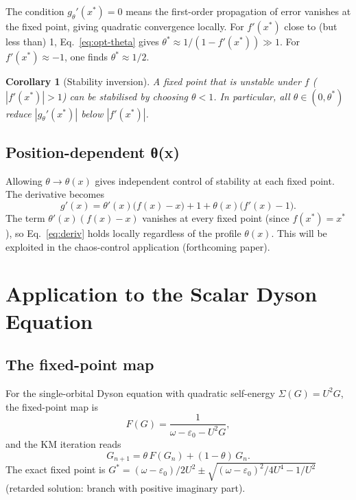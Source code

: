 \documentclass[aps,prb,twocolumn,superscriptaddress,nofootinbib,longbibliography,floatfix]{revtex4-2}
\newcommand{\param}{\theta}
\newcommand{\optparam}{\theta^{*}}
\newcommand{\Gstar}{G^{*}}
\theoremstyle{plain}
\newtheorem{corollary}[proposition]{Corollary}
\theoremstyle{remark}
\begin{document}
The condition $g_\param'(x^*) = 0$ means the first-order
propagation of error vanishes at the fixed point, giving
quadratic convergence locally.  For $f'(x^*)$ close to (but
less than) 1, Eq.~\eqref{eq:opt-theta} gives
$\optparam \approx 1/(1-f'(x^*)) \gg 1$.  For
$f'(x^*) \approx -1$, one finds $\optparam \approx 1/2$.

\begin{corollary}[Stability inversion]
\label{cor:inv}
A fixed point that is unstable under $f$ ($|f'(x^*)| > 1$) can
be stabilised by choosing $\param < 1$.  In particular, all
$\param \in (0, \optparam)$ reduce $|g_\param'(x^*)|$ below
$|f'(x^*)|$.
\end{corollary}

\subsection{Position-dependent θ(x)}
\label{ssec:local}

Allowing $\param \to \param(x)$ gives independent control of
stability at each fixed point.  The derivative becomes
%
\begin{equation}
  g'(x) = \param'(x)\bigl(f(x)-x\bigr)
           + 1 + \param(x)\bigl(f'(x)-1\bigr).
\end{equation}
%
The term $\param'(x)(f(x)-x)$ vanishes at every fixed point
(since $f(x^*) = x^*$), so Eq.~\eqref{eq:deriv} holds
locally regardless of the profile $\param(x)$.  This will be
exploited in the chaos-control application (forthcoming paper).

\section{Application to the Scalar Dyson Equation}
\label{sec:scalar}

\subsection{The fixed-point map}
\label{ssec:fp-map}

For the single-orbital Dyson equation with quadratic
self-energy $\Sigma(G) = U^2 G$, the fixed-point map is
%
\begin{equation}
  F(G) = \frac{1}{\omega - \varepsilon_0 - U^2 G},
  \label{eq:F}
\end{equation}
%
and the KM iteration reads
%
\begin{equation}
  G_{n+1} = \theta\,F(G_n) + (1-\theta)\,G_n.
  \label{eq:KM-dyson}
\end{equation}
%
The exact fixed point is
$\Gstar = (\omega - \varepsilon_0)/2U^2
\pm\sqrt{(\omega-\varepsilon_0)^2/4U^4 - 1/U^2}$
(retarded solution: branch with positive imaginary part).
\end{document}

